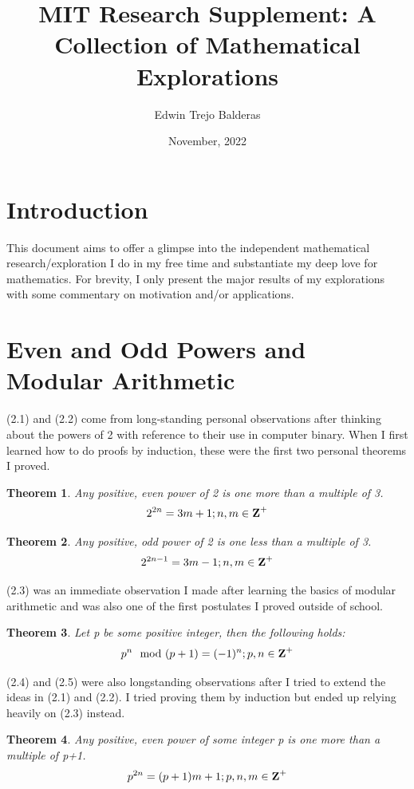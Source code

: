 \documentclass[11pt]{article}
\title{MIT Research Supplement: A Collection of Mathematical Explorations}
\author{Edwin Trejo Balderas}
\date{November, 2022}
\newtheorem{theorem}{Theorem}[section]
\begin{document}
\maketitle

\section{Introduction}
This document aims to offer a glimpse into the independent mathematical research/exploration I do in my free time and substantiate my deep love for mathematics. For brevity, I only present the major results of my explorations with some commentary on motivation and/or applications.

\section{Even and Odd Powers and Modular Arithmetic}

(2.1) and (2.2) come from long-standing personal observations after thinking about the powers of 2 with reference to their use in computer binary. When I first learned how to do proofs by induction, these were the first two personal theorems I proved.

\begin{theorem}
    Any positive, even power of 2 is one more than a multiple of 3. 
    $$2^{2n}=3m+1;n,m\in\mbox{\textbf{Z}}^+$$
\end{theorem}

\begin{theorem}
    Any positive, odd power of 2 is one less than a multiple of 3. 
    $$2^{2n-1}=3m-1;n,m\in\mbox{\textbf{Z}}^+$$
\end{theorem}

(2.3) was an immediate observation I made after learning the basics of modular arithmetic and was also one of the first postulates I proved outside of school.

\begin{theorem}
    Let \mbox{p} be some positive integer, then the following holds:
    $$p^n\mod{(p+1)}=(-1)^n;p,n\in\mbox{\textbf{Z}}^+$$
\end{theorem}

(2.4) and (2.5) were also longstanding observations after I tried to extend the ideas in (2.1) and (2.2). I tried proving them by induction but ended up relying heavily on (2.3) instead.

\begin{theorem}
    Any positive, even power of some integer \mbox{p} is one more than a multiple of \mbox{p+1}. 
    $$p^{2n}=(p+1)m+1;p,n,m\in\mbox{\textbf{Z}}^+$$
\end{theorem}
\end{document}
